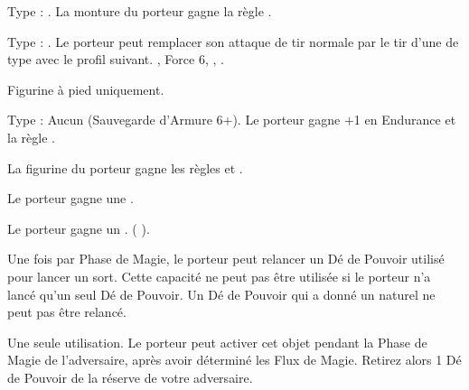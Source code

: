 Type : \lance{}. La monture du porteur gagne la règle .

Type : \shortbow{}. Le porteur peut remplacer son attaque de tir normale par le tir d'une \textbf{\artilleryweapon} de type \textbf{\boltthrower} avec le profil suivant.\newline
{}, Force 6, , .

\endpricelist

\armymagicalarmour

\startpricelist

Figurine à pied uniquement.

Type : Aucun (Sauvegarde d'Armure 6+). Le porteur gagne +1 en Endurance et la règle .

\endpricelist

\armytalismans

\startpricelist

La figurine du porteur gagne les règles \hardtarget{} et \fireborn{}.

\endpricelist

\armyenchanteditems

\startpricelist

Le porteur gagne une .

Le porteur gagne un . \whitemagicspellone{} (\Pathof{} \whitemagic{}).

\endpricelist

\armyarcaneitems

\startpricelist

Une fois par Phase de Magie, le porteur peut relancer un Dé de Pouvoir utilisé pour lancer un sort. Cette capacité ne peut pas être utilisée si le porteur n'a lancé qu'un seul Dé de Pouvoir. Un Dé de Pouvoir qui a donné un  naturel ne peut pas être relancé.

Une seule utilisation. Le porteur peut activer cet objet pendant la Phase de Magie de l'adversaire, après avoir déterminé les Flux de Magie. Retirez alors 1 Dé de Pouvoir de la réserve de votre adversaire.

\endpricelist

\armymagicalbanners

